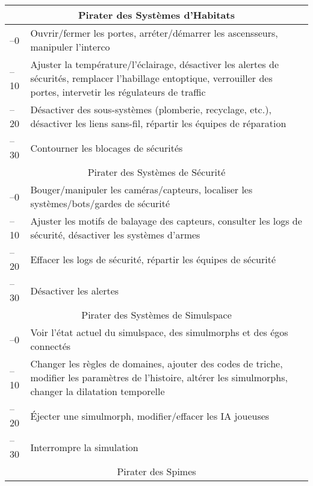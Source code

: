 \begin{table}
\begin{tabularx}{\textwidth}{|l|X|}
\multicolumn{2}{|c|}{Pirater des Systèmes d'Habitats} \\ \hline

–0 &Ouvrir/fermer les portes, arréter/démarrer les ascensseurs, manipuler l'interco \\ \hline

–10 &Ajuster la température/l'éclairage, désactiver les alertes de sécurités, remplacer l'habillage entoptique, verrouiller des portes, intervetir les régulateurs de traffic\\ \hline

–20 &Désactiver des sous-systèmes (plomberie, recyclage, etc.), désactiver les liens sans-fil, répartir les équipes de réparation \\ \hline

–30 &Contourner les blocages de sécurités\\ \hline

\multicolumn{2}{|c|}{Pirater des Systèmes de Sécurité} \\ \hline

–0 &Bouger/manipuler les caméras/capteurs, localiser les systèmes/bots/gardes de sécurité \\ \hline

–10 &Ajuster les motifs de balayage des capteurs, consulter les logs de sécurité, désactiver les systèmes d'armes \\ \hline

–20 &Effacer les logs de sécurité, répartir les équipes de sécurité\\ \hline

–30 &Désactiver les alertes \\ \hline

\multicolumn{2}{|c|}{Pirater des Systèmes de Simulspace} \\ \hline

–0 &Voir l'état actuel du simulspace, des simulmorphs et des égos connectés \\ \hline

–10 &Changer les règles de domaines, ajouter des codes de triche, modifier les paramètres de l'histoire, altérer les simulmorphs, changer la dilatation temporelle \\ \hline

–20 &Éjecter une simulmorph, modifier/effacer les IA joueuses \\ \hline

–30 &Interrompre la simulation \\ \hline

\multicolumn{2}{|c|}{Pirater des Spimes} \\ \hline


\end{tabularx}
\end{table}
